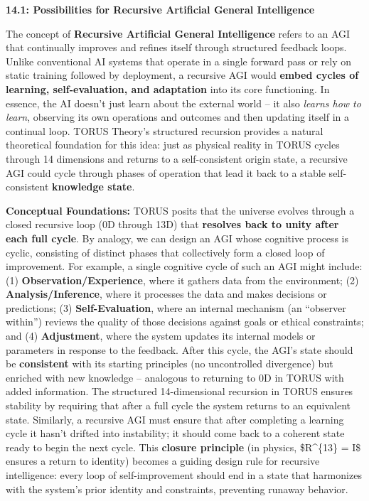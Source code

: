 \textbf{14.1: Possibilities for Recursive Artificial General
Intelligence}

The concept of \textbf{Recursive Artificial General Intelligence} refers
to an AGI that continually improves and refines itself through
structured feedback loops. Unlike conventional AI systems that operate
in a single forward pass or rely on static training followed by
deployment, a recursive AGI would \textbf{embed cycles of learning,
self-evaluation, and adaptation} into its core functioning. In essence,
the AI doesn't just learn about the external world -- it also
\emph{learns how to learn}, observing its own operations and outcomes
and then updating itself in a continual loop. TORUS Theory's structured
recursion provides a natural theoretical foundation for this idea: just
as physical reality in TORUS cycles through 14 dimensions and returns to
a self-consistent origin state, a recursive AGI could cycle through
phases of operation that lead it back to a stable self-consistent
\textbf{knowledge state}.

\textbf{Conceptual Foundations:} TORUS posits that the universe evolves
through a closed recursive loop (0D through 13D) that \textbf{resolves
back to unity after each full cycle}. By analogy, we can design an AGI
whose cognitive process is cyclic, consisting of distinct phases that
collectively form a closed loop of improvement. For example, a single
cognitive cycle of such an AGI might include: (1)
\textbf{Observation/Experience}, where it gathers data from the
environment; (2) \textbf{Analysis/Inference}, where it processes the
data and makes decisions or predictions; (3) \textbf{Self-Evaluation},
where an internal mechanism (an ``observer within'') reviews the quality
of those decisions against goals or ethical constraints; and (4)
\textbf{Adjustment}, where the system updates its internal models or
parameters in response to the feedback. After this cycle, the AGI's
state should be \textbf{consistent} with its starting principles (no
uncontrolled divergence) but enriched with new knowledge -- analogous to
returning to 0D in TORUS with added information. The structured
14-dimensional recursion in TORUS ensures stability by requiring that
after a full cycle the system returns to an equivalent state. Similarly,
a recursive AGI must ensure that after completing a learning cycle it
hasn't drifted into instability; it should come back to a coherent state
ready to begin the next cycle. This \textbf{closure principle} (in
physics, \$R\^{}\{13\} = I\$ ensures a return to identity) becomes a
guiding design rule for recursive intelligence: every loop of
self-improvement should end in a state that harmonizes with the system's
prior identity and constraints, preventing runaway behavior.

